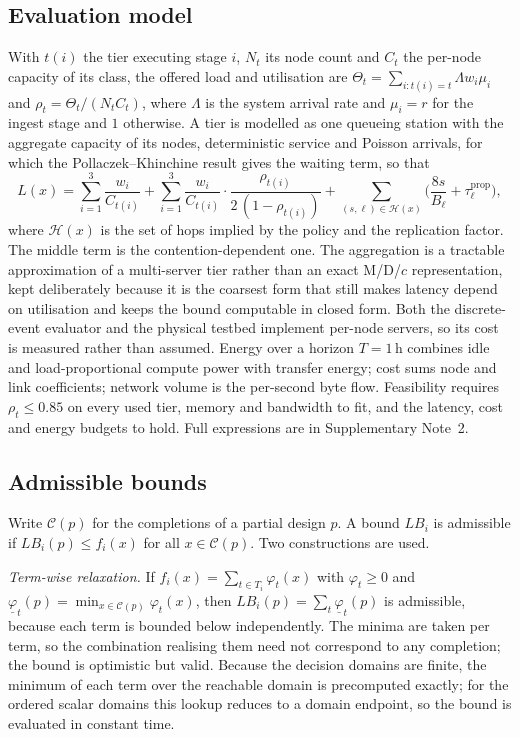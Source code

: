 \documentclass[pdflatex,sn-nature,lineno]{sn-jnl}
\newcommand{\C}{\mathcal{C}}
\newcommand{\LB}{\mathit{LB}}
\begin{document}
\subsection{Evaluation model}
With $t(i)$ the tier executing stage $i$, $N_t$ its node count and $C_t$ the per-node
capacity of its class, the offered load and utilisation are
$\Theta_t=\sum_{i:t(i)=t}\Lambda w_i\mu_i$ and $\rho_t=\Theta_t/(N_tC_t)$, where
$\Lambda$ is the system arrival rate and $\mu_i=r$ for the ingest stage and $1$
otherwise. A tier is modelled as one queueing station with the aggregate capacity of its
nodes, deterministic service and Poisson arrivals, for which the Pollaczek--Khinchine
result gives the waiting term\cite{kleinrock1975queueing,harchol2013performance}, so
that
\begin{equation}
L(x)=\sum_{i=1}^{3}\frac{w_i}{C_{t(i)}}
+\sum_{i=1}^{3}\frac{w_i}{C_{t(i)}}\cdot\frac{\rho_{t(i)}}{2\,(1-\rho_{t(i)})}
+\sum_{(s,\ell)\in\mathcal{H}(x)}\Big(\frac{8s}{B_\ell}+\tau^{\mathrm{prop}}_\ell\Big),
\label{eq:ce:latency}
\end{equation}
where $\mathcal{H}(x)$ is the set of hops implied by the policy and the replication
factor. The middle term is the contention-dependent one. The aggregation is a tractable approximation of a multi-server tier rather than an exact
M/D/$c$ representation, kept deliberately because it is the coarsest form that still makes
latency depend on utilisation and keeps the bound computable in closed form. Both the discrete-event
evaluator and the physical testbed implement per-node servers, so its cost is measured
rather than assumed. Energy over a horizon $T=1$\,h combines idle and load-proportional
compute power with transfer energy; cost sums node and link coefficients; network volume
is the per-second byte flow. Feasibility requires $\rho_t\le0.85$ on every used tier,
memory and bandwidth to fit, and the latency, cost and energy budgets to hold. Full
expressions are in Supplementary Note~2.

\subsection{Admissible bounds}
Write $\C(p)$ for the completions of a partial design $p$. A bound $\LB_i$ is admissible
if $\LB_i(p)\le f_i(x)$ for all $x\in\C(p)$. Two constructions are used.

\emph{Term-wise relaxation.} If $f_i(x)=\sum_{t\in T_i}\varphi_t(x)$ with
$\varphi_t\ge0$ and $\underline{\varphi}_t(p)=\min_{x\in\C(p)}\varphi_t(x)$, then
$\LB_i(p)=\sum_t\underline{\varphi}_t(p)$ is admissible, because each term is bounded
below independently. The minima are taken per term, so the combination realising them
need not correspond to any completion; the bound is optimistic but valid. Because the decision domains are finite, the minimum of each term over the reachable
domain is precomputed exactly; for the ordered scalar domains this lookup reduces to a
domain endpoint, so the bound is evaluated in constant time.
\end{document}
